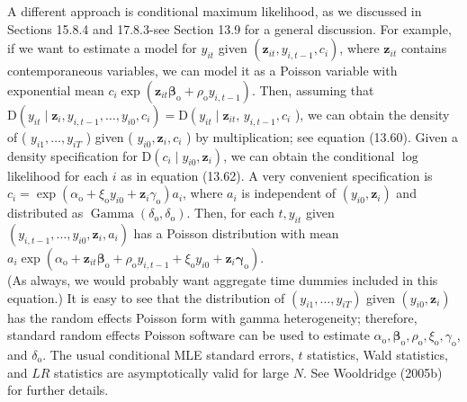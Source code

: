 \documentclass[10pt]{article}
\begin{document}
A different approach is conditional maximum likelihood, as we discussed in Sections 15.8.4 and 17.8.3-see Section 13.9 for a general discussion. For example, if we want to estimate a model for $y_{i t}$ given $\left(\mathbf{z}_{i t}, y_{i, t-1}, c_{i}\right)$, where $\mathbf{z}_{i t}$ contains contemporaneous variables, we can model it as a Poisson variable with exponential mean $c_{i} \exp \left(\mathbf{z}_{i t} \boldsymbol{\beta}_{\mathrm{o}}+\rho_{\mathrm{o}} y_{i, t-1}\right)$. Then, assuming that $\mathrm{D}\left(y_{i t} \mid \mathbf{z}_{i}, y_{i, t-1}, \ldots, y_{i 0}, c_{i}\right)=\mathrm{D}\left(y_{i t} \mid \mathbf{z}_{i t}\right.$, $y_{i, t-1}, c_{i}$ ), we can obtain the density of ( $y_{i 1}, \ldots, y_{i T}$ ) given ( $y_{i 0}, \mathbf{z}_{i}, c_{i}$ ) by multiplication; see equation (13.60). Given a density specification for $\mathrm{D}\left(c_{i} \mid y_{i 0}, \mathbf{z}_{i}\right)$, we can obtain the conditional $\log$ likelihood for each $i$ as in equation (13.62). A very convenient specification is $c_{i}=\exp \left(\alpha_{\mathrm{o}}+\xi_{\mathrm{o}} y_{i 0}+\mathbf{z}_{i} \gamma_{\mathrm{o}}\right) a_{i}$, where $a_{i}$ is independent of $\left(y_{i 0}, \mathbf{z}_{i}\right)$ and distributed as $\operatorname{Gamma}\left(\delta_{\mathrm{o}}, \delta_{\mathrm{o}}\right)$. Then, for each $t, y_{i t}$ given $\left(y_{i, t-1}, \ldots, y_{i 0}, \mathbf{z}_{i}, a_{i}\right)$ has a Poisson distribution with mean\\
$a_{i} \exp \left(\alpha_{\mathrm{o}}+\mathbf{z}_{i t} \boldsymbol{\beta}_{\mathrm{o}}+\rho_{\mathrm{o}} y_{i, t-1}+\xi_{\mathrm{o}} y_{i 0}+\mathbf{z}_{i} \boldsymbol{\gamma}_{\mathrm{o}}\right)$.\\
(As always, we would probably want aggregate time dummies included in this equation.) It is easy to see that the distribution of $\left(y_{i 1}, \ldots, y_{i T}\right)$ given $\left(y_{i 0}, \mathbf{z}_{i}\right)$ has the random effects Poisson form with gamma heterogeneity; therefore, standard random effects Poisson software can be used to estimate $\alpha_{\mathrm{o}}, \boldsymbol{\beta}_{\mathrm{o}}, \rho_{\mathrm{o}}, \xi_{\mathrm{o}}, \gamma_{\mathrm{o}}$, and $\delta_{\mathrm{o}}$. The usual conditional MLE standard errors, $t$ statistics, Wald statistics, and $L R$ statistics are asymptotically valid for large $N$. See Wooldridge (2005b) for further details.
\end{document}
